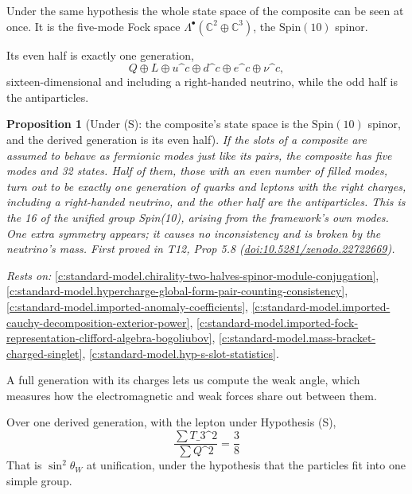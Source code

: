 \documentclass[11pt]{article}
\newtheorem{proposition}[theorem]{Proposition}
\theoremstyle{definition}
\theoremstyle{plain}
\providecommand{\C}{}\renewcommand{\C}{\mathbb{C}}
\begin{document}
Under the same hypothesis the whole state space of the composite can be seen at once. It is the five-mode Fock space $\Lambda^{\bullet}(\C^{2} \oplus \C^{3})$, the $\mathrm{Spin}(10)$ spinor.

Its even half is exactly one generation, \[ Q \oplus L \oplus u\^{}{c} \oplus d\^{}{c} \oplus e\^{}{c} \oplus \nu\^{}{c}, \] sixteen-dimensional and including a right-handed neutrino, while the odd half is the antiparticles.

\begin{proposition}[Under (S): the composite's state space is the $\mathrm{Spin}(10)$ spinor, and the derived generation is its even half]\label{c:standard-model.under-s-composites-state-space-spinor}
If the slots of a composite are assumed to behave as fermionic modes just like its pairs, the composite has five modes and 32 states. Half of them, those with an even number of filled modes, turn out to be exactly one generation of quarks and leptons with the right charges, including a right-handed neutrino, and the other half are the antiparticles. This is the 16 of the unified group Spin(10), arising from the framework's own modes. One extra symmetry appears; it causes no inconsistency and is broken by the neutrino's mass.
\emph{First proved in} T12, Prop 5.8 (\href{https://doi.org/10.5281/zenodo.22722669}{doi:10.5281/zenodo.22722669}).
\end{proposition}
\noindent\emph{Rests on:} \ref{c:standard-model.chirality-two-halves-spinor-module-conjugation}, \ref{c:standard-model.hypercharge-global-form-pair-counting-consistency}, \ref{c:standard-model.imported-anomaly-coefficients}, \ref{c:standard-model.imported-cauchy-decomposition-exterior-power}, \ref{c:standard-model.imported-fock-representation-clifford-algebra-bogoliubov}, \ref{c:standard-model.mass-bracket-charged-singlet}, \ref{c:standard-model.hyp-s-slot-statistics}.

A full generation with its charges lets us compute the weak angle, which measures how the electromagnetic and weak forces share out between them.

Over one derived generation, with the lepton under Hypothesis (S), \[ \frac{\sum T\_{3}\^{}{2}}{\sum Q\^{}{2}} = \frac{3}{8} \] That is $\sin^{2}\theta_{W}$ at unification, under the hypothesis that the particles fit into one simple group.
\end{document}
